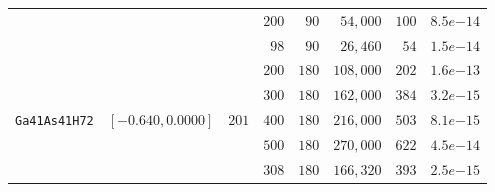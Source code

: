 \begin{tabular}{l|c|c|c|c|c|c|c}
 & & & $200$ & $\phantom{0}90$ & $\phantom{0}54,000$ & $100$ & $8.5e{-14}$ \\
 & & & $\phantom{0}98$ & $\phantom{0}90$ & $\phantom{0}26,460$ & $\phantom{0}54$ & $1.5e{-14}$ \\\hline
 & & & $200$ & $180$ & $108,000$ & $202$ & $1.6e{-13}$ \\
 & & & $300$ & $180$ & $162,000$ & $384$ & $3.2e{-15}$ \\
\verb|Ga41As41H72| & $[-0.640,0.0000]$ & $201$ & $400$ & $180$ & $216,000$ & $503$ & $8.1e{-15}$ \\
 & & & $500$ & $180$ & $270,000$ & $622$ & $4.5e{-14}$ \\
 & & & $308$ & $180$ & $166,320$ & $393$ & $2.5e{-15}$ \\\hline
\end{tabular}